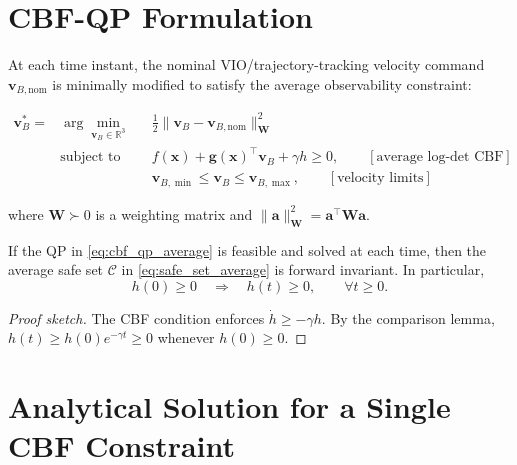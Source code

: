 \documentclass[11pt,a4paper]{article}
\newcommand{\R}{\mathbb{R}}
\begin{document}
\section{CBF-QP Formulation}

At each time instant, the nominal VIO/trajectory-tracking velocity command
$\bm{v}_{B,\mathrm{nom}}$ is minimally modified to satisfy the average
observability constraint:
\begin{keyresult}
\begin{equation}
  \boxed{
  \begin{aligned}
  \bm{v}_{B}^{*}
  ={}&\arg\min_{\bm{v}_{B}\in\R^{3}}
  &&\frac{1}{2}\|\bm{v}_{B}-\bm{v}_{B,\mathrm{nom}}\|_{\bm{W}}^{2}\\
  &\text{subject to}
  && f(\bm{x}) + \bm{g}(\bm{x})^{\top}\bm{v}_{B} + \gamma h \ge 0,
  \qquad [\text{average log-det CBF}]\\
  &&&\bm{v}_{B,\min}\le\bm{v}_{B}\le\bm{v}_{B,\max},
  \qquad [\text{velocity limits}]
  \end{aligned}}
  \label{eq:cbf_qp_average}
\end{equation}
\end{keyresult}
where $\bm{W}\succ0$ is a weighting matrix and
$\|\bm{a}\|_{\bm{W}}^{2}=\bm{a}^{\top}\bm{W}\bm{a}$.

\begin{theorem}
If the QP in \eqref{eq:cbf_qp_average} is feasible and solved at each time,
then the average safe set $\mathcal{C}$ in \eqref{eq:safe_set_average} is
forward invariant.  In particular,
\begin{equation}
  h(0)\ge0\quad\Longrightarrow\quad h(t)\ge0,
  \qquad \forall t\ge0.
\end{equation}
\begin{proof}[Proof sketch]
The CBF condition enforces $\dot{h}\ge-\gamma h$.  By the comparison lemma,
$h(t)\ge h(0)e^{-\gamma t}\ge0$ whenever $h(0)\ge0$.
\end{proof}
\end{theorem}

\section{Analytical Solution for a Single CBF Constraint}
\end{document}
